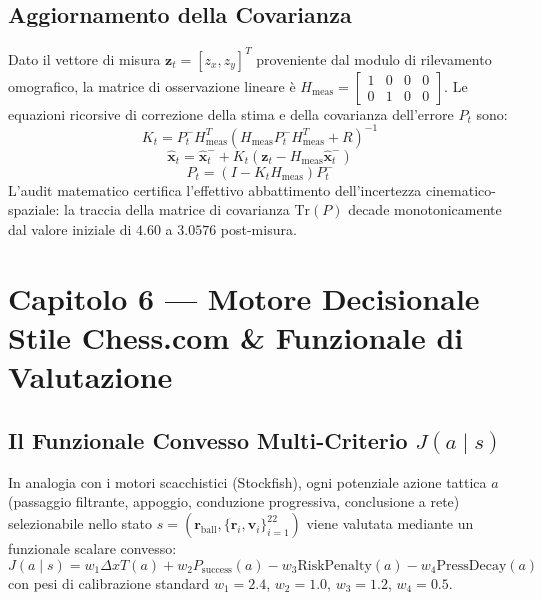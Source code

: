 \documentclass[11pt,a4paper]{article}
\begin{document}
\subsection{Aggiornamento della Covarianza}
Dato il vettore di misura $\mathbf{z}_t = [z_x, z_y]^T$ proveniente dal modulo di rilevamento omografico, la matrice di osservazione lineare è $H_{\text{meas}} = \begin{bmatrix} 1 & 0 & 0 & 0 \\ 0 & 1 & 0 & 0 \end{bmatrix}$. Le equazioni ricorsive di correzione della stima e della covarianza dell'errore $P_t$ sono:
\begin{equation}
K_t = P_t^- H_{\text{meas}}^T \left( H_{\text{meas}} P_t^- H_{\text{meas}}^T + R \right)^{-1}
\end{equation}
\begin{equation}
\hat{\mathbf{x}}_t = \hat{\mathbf{x}}_t^- + K_t \left( \mathbf{z}_t - H_{\text{meas}} \hat{\mathbf{x}}_t^- \right)
\end{equation}
\begin{equation}
P_t = (I - K_t H_{\text{meas}}) P_t^-
\end{equation}
L'audit matematico certifica l'effettivo abbattimento dell'incertezza cinematico-spaziale: la traccia della matrice di covarianza $\text{Tr}(P)$ decade monotonicamente dal valore iniziale di $4.60$ a $3.0576$ post-misura.


\section{Capitolo 6 — Motore Decisionale Stile Chess.com \& Funzionale di Valutazione}

\subsection{Il Funzionale Convesso Multi-Criterio $J(a \mid s)$}
In analogia con i motori scacchistici (Stockfish), ogni potenziale azione tattica $a$ (passaggio filtrante, appoggio, conduzione progressiva, conclusione a rete) selezionabile nello stato $s = (\mathbf{r}_{\text{ball}}, \{\mathbf{r}_i, \mathbf{v}_i\}_{i=1}^{22})$ viene valutata mediante un funzionale scalare convesso:
\begin{equation}
J(a \mid s) = w_1 \Delta xT(a) + w_2 P_{\text{success}}(a) - w_3 \text{RiskPenalty}(a) - w_4 \text{PressDecay}(a)
\end{equation}
con pesi di calibrazione standard $w_1 = 2.4$, $w_2 = 1.0$, $w_3 = 1.2$, $w_4 = 0.5$.
\end{document}
